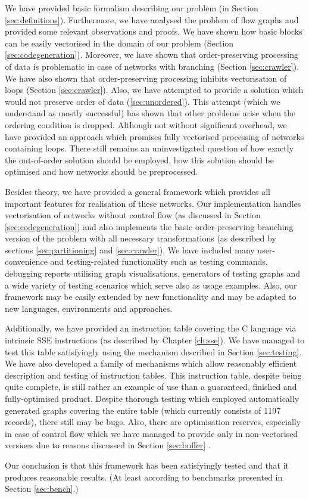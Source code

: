 We have provided basic formalism describing our problem (in Section \ref{sec:definitions}). Furthermore, we have analysed the problem of flow graphs and provided some relevant observations and proofs. We have shown how basic blocks can be easily vectorised in the domain of our problem (Section \ref{sec:codegeneration}). Moreover, we have shown that order-preserving processing of data is problematic in case of networks with branching (Section \ref{sec:crawler}). We have also shown that order-preserving processing inhibits vectorisation of loops (Section \ref{sec:crawler}). Also, we have attempted to provide a solution which would not preserve order of data (\ref{sec:unordered}). This attempt (which we understand as mostly successful) has shown that other problems arise when the ordering condition is dropped. Although not without significant overhead, we have provided an approach which promises fully vectorised processing of networks containing loops. There still remains an uninvestigated question of how exactly the out-of-order solution should be employed, how this solution should be optimised and how networks should be preprocessed.

Besides theory, we have provided a general framework which provides all important features for realisation of these networks. Our implementation handles vectorisation of networks without control flow (as discussed in Section \ref{sec:codegeneration}) and also implements the basic order-preserving branching version of the problem with all necessary transformations (as described by sections \ref{sec:partitioning} and \ref{sec:crawler}). We have included many user-convenience and testing-related functionality such as testing commands, debugging reports utilising graph visualisations, generators of testing graphs and a wide variety of testing scenarios which serve also as usage examples.  Also, our framework may be easily extended by new functionality and may be adapted to new languages, environments and approaches. 

Additionally, we have provided an instruction table covering the C language via intrinsic SSE instructions (as described by Chapter \ref{ch:sse}). We have managed to test this table satisfyingly using the mechanism described in Section \ref{sec:testing}. We have also developed a family of mechanisms which allow reasonably efficient description and testing of instruction tables. This instruction table, despite being quite complete, is still rather an example of use than a guaranteed, finished and fully-optimised product. Despite thorough testing which employed automatically generated graphs covering the entire table (which currently consists of 1197 records), there still may be bugs. Also, there are optimisation reserves, especially in case of control flow which we have managed to provide only in non-vectorised versions due to reasons discussed in Section \ref{sec:buffer} . 

Our conclusion is that this framework has been satisfyingly tested and that it produces reasonable results. (At least according to benchmarks presented in Section \ref{sec:bench}.)

